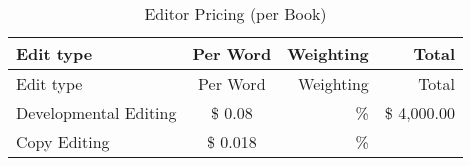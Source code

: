 \documentclass[10pt,openany]{book}
\begin{document}
\begin{longtable}[]{@{}lcrr@{}}
\caption{Editor Pricing (per Book)}\tabularnewline
\toprule
\begin{minipage}[b]{0.34\columnwidth}\raggedright
Edit type\strut
\end{minipage} & \begin{minipage}[b]{0.16\columnwidth}\centering
Per Word\strut
\end{minipage} & \begin{minipage}[b]{0.16\columnwidth}\raggedleft
Weighting\strut
\end{minipage} & \begin{minipage}[b]{0.22\columnwidth}\raggedleft
Total\strut
\end{minipage}\tabularnewline
\midrule
\endfirsthead
\toprule
\begin{minipage}[b]{0.34\columnwidth}\raggedright
Edit type\strut
\end{minipage} & \begin{minipage}[b]{0.16\columnwidth}\centering
Per Word\strut
\end{minipage} & \begin{minipage}[b]{0.16\columnwidth}\raggedleft
Weighting\strut
\end{minipage} & \begin{minipage}[b]{0.22\columnwidth}\raggedleft
Total\strut
\end{minipage}\tabularnewline
\midrule
\endhead
\begin{minipage}[t]{0.34\columnwidth}\raggedright
Developmental Editing\strut
\end{minipage} & \begin{minipage}[t]{0.16\columnwidth}\centering
\$ 0.08\strut
\end{minipage} & \begin{minipage}[t]{0.16\columnwidth}\raggedleft
30\%\strut
\end{minipage} & \begin{minipage}[t]{0.22\columnwidth}\raggedleft
\$ 4,000.00\strut
\end{minipage}\tabularnewline
\begin{minipage}[t]{0.34\columnwidth}\raggedright
Copy Editing\strut
\end{minipage} & \begin{minipage}[t]{0.16\columnwidth}\centering
\$ 0.018\strut
\end{minipage} & \begin{minipage}[t]{0.16\columnwidth}\raggedleft
50\%\strut
\end{minipage} & \begin{minipage}[t]{0.22\columnwidth}\raggedleft

\end{minipage}
\end{longtable}
\end{document}
